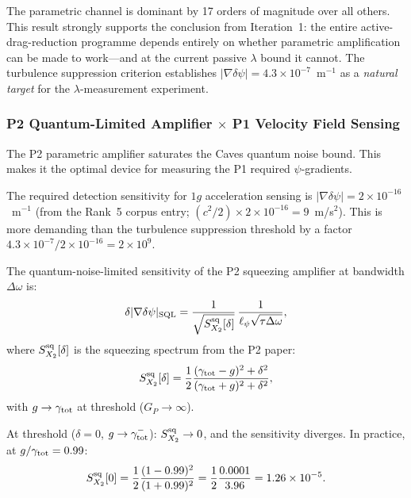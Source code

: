 \documentclass[11pt,twocolumn]{article}
\newcommand{\dpsi}{\delta\psi}
\newcommand{\lam}{\lambda}
\begin{document}
The parametric channel is dominant by 17 orders of magnitude over all others.
This result strongly supports the conclusion from Iteration~1: the entire
active-drag-reduction programme depends entirely on whether parametric
amplification can be made to work---and at the current passive $\lam$ bound
it cannot. The turbulence suppression criterion establishes $|\nabla\dpsi|
= 4.3\times10^{-7}$~m$^{-1}$ as a \emph{natural target} for the $\lam$-measurement
experiment.

\subsubsection{P2 Quantum-Limited Amplifier $\times$ P1 Velocity Field Sensing}
\label{sec:p2_p1_sensing}

The P2 parametric amplifier saturates the Caves quantum noise bound.
This makes it the optimal device for measuring the P1 required $\psi$-gradients.

The required detection sensitivity for $1g$ acceleration sensing is
$|\nabla\dpsi| = 2\times10^{-16}$~m$^{-1}$ (from the Rank~5 corpus entry;
$(c^2/2)\times2\times10^{-16} = 9$~m/s$^2$). This is more demanding than the
turbulence suppression threshold by a factor $4.3\times10^{-7}/2\times10^{-16} = 2\times10^9$.

The quantum-noise-limited sensitivity of the P2 squeezing amplifier at bandwidth
$\Delta\omega$ is:
\begin{equation}
\delta|\nabla\dpsi|_{\rm SQL} = \frac{1}{\sqrt{S_{X_2}^{\rm sq}[\delta]}}\,
\frac{1}{\ell_\psi\sqrt{\tau\Delta\omega}},
\label{eq:sql_sensitivity}
\end{equation}
where $S_{X_2}^{\rm sq}[\delta]$ is the squeezing spectrum from the P2 paper:
\begin{equation}
S_{X_2}^{\rm sq}[\delta] = \frac{1}{2}\frac{(\gamma_{\rm tot}-g)^2+\delta^2}
{(\gamma_{\rm tot}+g)^2+\delta^2},
\label{eq:sq_spectrum}
\end{equation}
with $g \to \gamma_{\rm tot}$ at threshold ($G_P \to \infty$).

At threshold ($\delta = 0$, $g \to \gamma_{\rm tot}^-$):
$S_{X_2}^{\rm sq} \to 0$, and the sensitivity diverges.
In practice, at $g/\gamma_{\rm tot} = 0.99$:
\begin{equation}
S_{X_2}^{\rm sq}[0] = \frac{1}{2}\frac{(1-0.99)^2}{(1+0.99)^2}
= \frac{1}{2}\frac{0.0001}{3.96} = 1.26\times10^{-5}.
\label{eq:sq_near_threshold}
\end{equation}
\end{document}

